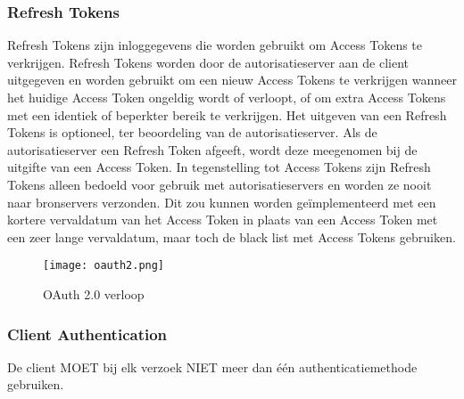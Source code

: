 \subsubsection{Refresh Tokens}%
\label{subsubsec:refresh-tokens}
Refresh Tokens zijn inloggegevens die worden gebruikt om Access Tokens te verkrijgen. Refresh Tokens worden door de autorisatieserver aan de client uitgegeven en worden gebruikt om een nieuw Access Tokens te verkrijgen wanneer het huidige Access Token ongeldig wordt of verloopt, of om extra Access Tokens met een identiek of beperkter bereik te verkrijgen. Het uitgeven van een Refresh Tokens is optioneel, ter beoordeling van de autorisatieserver. Als de autorisatieserver een Refresh Token afgeeft, wordt deze meegenomen bij de uitgifte van een Access Token. In tegenstelling tot Access Tokens zijn Refresh Tokens alleen bedoeld voor gebruik met autorisatieservers en worden ze nooit naar bronservers verzonden.
Dit zou kunnen worden geïmplementeerd met een kortere vervaldatum van het Access Token in plaats van een Access Token met een zeer lange vervaldatum, maar toch de black list met Access Tokens gebruiken.
\begin{figure}[h]
  \centering
  \texttt{[image: oauth2.png]}
  \caption{OAuth 2.0 verloop}
  \label{fig:example}
\end{figure}

\subsubsection{Client Authentication}
\label{subsubsec:client-authentication}
De client MOET bij elk verzoek NIET meer dan één authenticatiemethode gebruiken.

